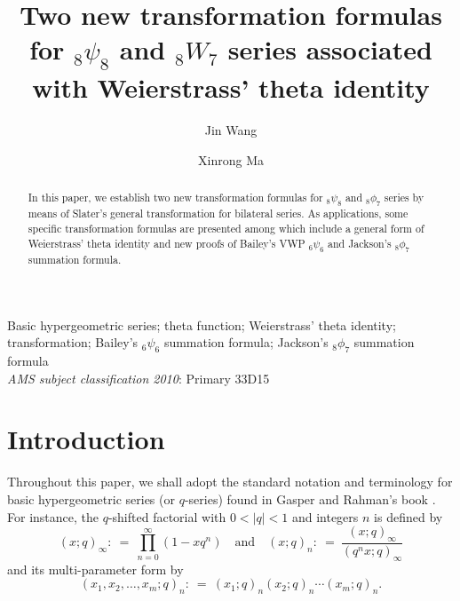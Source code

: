 \documentclass[xits,review,sort&compress]{elsarticle}
\numberwithin{equation}{section}
\begin{document}
\title {Two new transformation formulas for ${}_{8}\psi_{8}$ and ${}_{8}W_{7}$ series  associated with Weierstrass' theta identity}
\author{Jin Wang}
\address[Canada]{Department of Mathematics, Zhejiang Normal  University,
Jinhua 321004,~P.~R.~China}
\author{Xinrong Ma}
\address[P.R.China]{Department of Mathematics, Soochow University, Suzhou 215006, P. R. China}
\begin{abstract}
In this paper, we establish two new transformation formulas  for ${}_{8}\psi_{8}$ and ${}_8\phi_7$ series by means of  Slater's general transformation for bilateral series. As applications, some specific transformation formulas are presented among which include a general form of Weierstrass' theta identity and new proofs of  Bailey's VWP ${}_6\psi_6$ and Jackson's  ${}_8\phi_7$ summation formula.
\end{abstract}
\begin{keyword} Basic hypergeometric series;  theta function;  Weierstrass' theta identity; transformation; Bailey's ${}_6\psi_6$ summation formula; Jackson's  ${}_8\phi_7$ summation formula
\vspace{5pt}
\\
{\sl AMS subject classification 2010}: Primary  33D15
\end{keyword}
\maketitle
\thispagestyle{empty}
\parskip 7pt


\section{Introduction}
Throughout this paper, we shall adopt the standard notation and terminology for basic
hypergeometric series (or $q$-series) found in Gasper and Rahman's book  \cite{10}. For instance, the $q$-shifted factorial with $0<|q|<1$ and integers $n$ is defined by
\[(x;q)_\infty:
\:=\:\prod_{n=0}^{\infty}(1-xq^n) \quad\text{and}\quad
(x;q)_n:\:=\:\frac{(x;q)_\infty}{(q^nx;q)_\infty}
\]
 and its multi-parameter form by
\[(x_1,x_2,\ldots,x_m;q)_n:\:=\:(x_1;q)_n(x_2;q)_n\cdots(x_m;q)_n.\]
\end{document}
